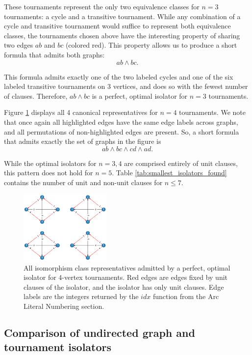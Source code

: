 \documentclass[conference]{IEEEtran}
\begin{document}
These tournaments represent the only two equivalence classes for $n=3$ tournaments: a cycle and a transitive tournament. While any combination of a cycle and transitive tournament would suffice to represent both equivalence classes, the tournaments chosen above have the interesting property of sharing two edges $ab$ and $bc$ (colored red). This property allows us to produce a short formula that admits both graphs:
\[
ab \land bc.
\]

This formula admits exactly one of the two labeled cycles and one of the six labeled transitive tournaments on 3 vertices, and does so with the fewest number of clauses. Therefore, $ab \land bc$ is a perfect, optimal isolator for $n=3$ tournaments.

Figure \ref{iso4} displays all 4 canonical representatives for $n=4$ tournaments. We note that once again all highlighted edges have the same edge labels across graphs, and all permutations of non-highlighted edges are present. So, a short formula that admits exactly the set of graphs in the figure is
\[
ab \land bc \land cd \land ad.
\]

While the optimal isolators for $n=3,4$ are comprised entirely of unit clauses, this pattern does not hold for $n=5$. Table \ref{tab:smallest_isolators_found} contains the number of unit and non-unit clauses for $n \le 7$.

\begin{figure}
\centering
\includegraphics[width=0.4\textwidth]{iso_4.png}
\caption{All isomorphism class representatives admitted by a perfect, optimal isolator for 4-vertex tournaments. Red edges are edges fixed by unit clauses of the isolator, and the isolator has only unit clauses. Edge labels are the integers returned by the $\mathit{idx}$ function from the Arc Literal Numbering section.} \label{iso4}
\end{figure}

\subsection{Comparison of undirected graph and tournament isolators}
\end{document}
